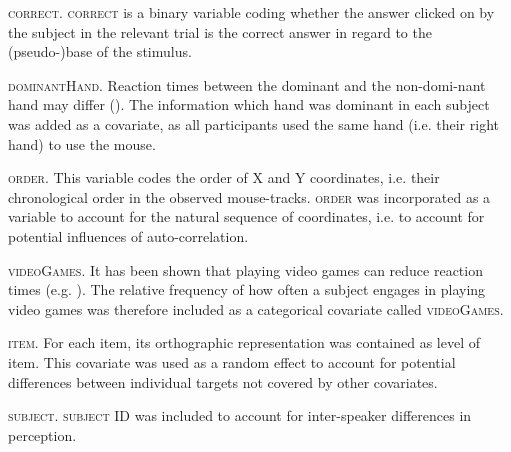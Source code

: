 \textsc{correct}. \textsc{correct} is a binary variable coding whether the answer clicked on by the subject in the relevant trial is the correct answer in regard to the (pseudo-)base of the stimulus.

\textsc{dominantHand}. Reaction times between the dominant and the non-domi-nant hand may differ (\cite{Gignac2004}). The information which hand was dominant in each subject was added as a covariate, as all participants used the same hand (i.e. their right hand) to use the mouse.

\textsc{order}. This variable codes the order of X and Y coordinates, i.e. their chronological order in the observed mouse-tracks. \textsc{order} was incorporated as a variable to account for the natural sequence of coordinates, i.e. to account for potential influences of auto-correlation. 

\textsc{videoGames}. It has been shown that playing video games can reduce reaction times (e.g. \cite{Dye2009}). The relative frequency of how often a subject engages in playing video games was therefore included as a categorical covariate called \textsc{videoGames}.

\textsc{item}. For each item, its orthographic representation was contained as level of item. This covariate was used as a random effect to account for potential differences between individual targets not covered by other covariates.

\textsc{subject}. \textsc{subject} ID was included to account for inter-speaker differences in perception.

